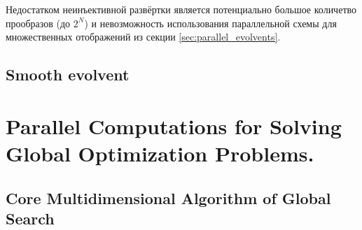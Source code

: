 \documentclass[runningheads]{llncs}
\begin{document}
Недостатком неинъективной развёртки является потенциально большое количетво прообразов (до $2^N$) и невозможность использования параллельной схемы для множественных отображений из секции \ref{sec:parallel_evolvents}.

\subsection{Smooth evolvent}



\section{Parallel Computations for Solving Global Optimization Problems.}
\subsection{Core Multidimensional Algorithm of Global Search}
\end{document}
